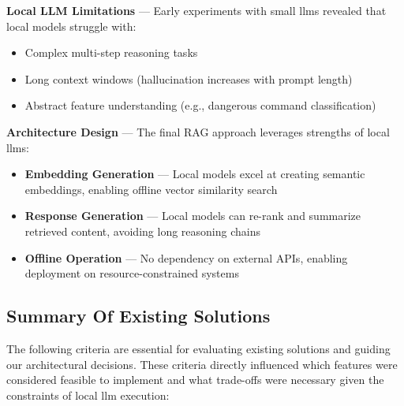 \textbf{Local LLM Limitations} --- Early experiments with small
\glspl{llm} revealed that local models struggle with:
\begin{itemize}
  \item Complex multi-step reasoning tasks
  \item Long context windows (hallucination increases with prompt length)
  \item Abstract feature understanding (e.g., dangerous command classification)
\end{itemize}

\textbf{Architecture Design} --- The final RAG approach leverages strengths
of local \glspl{llm}:
\begin{itemize}
  \item \textbf{Embedding Generation} --- Local models excel at creating
    semantic embeddings, enabling offline vector similarity search
  \item \textbf{Response Generation} --- Local models can re-rank and
    summarize retrieved content, avoiding long reasoning chains
  \item \textbf{Offline Operation} --- No dependency on external APIs,
    enabling deployment on resource-constrained systems
\end{itemize}

\subsection{Summary Of Existing Solutions}\label{sec:existing-solutions-summary}

The following criteria are essential for evaluating existing solutions and
guiding our architectural decisions. These criteria directly influenced which
features were considered feasible to implement and what trade-offs were
necessary given the constraints of local \gls{llm} execution:

